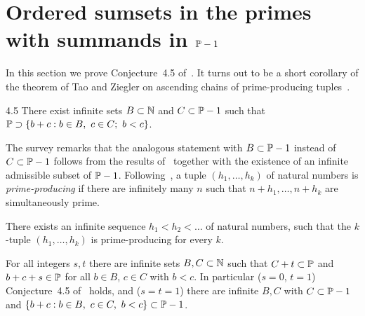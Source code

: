 \section{Ordered sumsets in the primes with summands in \texorpdfstring{$\P-1$}{P-1}}
\label{IB:sec:c45}

In this section we prove Conjecture~4.5 of~\cite{kra2023problems}. It turns out
to be a short corollary of the theorem of Tao and Ziegler on ascending chains of
prime-producing tuples~\cite{tao2023infinite}.

\begin{surveyconj}{4.5}
\label{IB:q:c45}
There exist infinite sets $B\subset\N$ and $C\subset\P-1$ such that
$\P\supset\{b+c:b\in B,\ c\in C;\ b<c\}$.
\end{surveyconj}

The survey remarks that the analogous statement with $B\subset\P-1$ instead of
$C\subset\P-1$ follows from the results of~\cite{tao2023infinite} together with the
existence of an infinite admissible subset of $\P-1$. Following~\cite[Definition~1.1]{tao2023infinite},
a tuple $(h_1,\dots,h_k)$ of natural numbers is \emph{prime-producing} if there are
infinitely many $n$ such that $n+h_1,\dots,n+h_k$ are simultaneously prime.

\begin{theorem*}
There exists an infinite sequence $h_1<h_2<\dots$ of natural numbers, such that the
$k$-tuple $(h_1,\dots,h_k)$ is prime-producing for every $k$.
\end{theorem*}

\begin{theorem}
\label{IB:thm:c45}
For all integers $s,t$ there are infinite sets $B,C\subset\N$ such that $C+t\subset\P$ and
$b+c+s\in\P$ for all $b\in B$, $c\in C$ with $b<c$. In particular
\textup{(}$s=0$, $t=1$\textup{)} Conjecture~4.5 of~\cite{kra2023problems} holds, and
\textup{(}$s=t=1$\textup{)} there are infinite $B,C$ with $C\subset\P-1$ and
$\{b+c:b\in B,\ c\in C,\ b<c\}\subset\P-1$.
\end{theorem}

